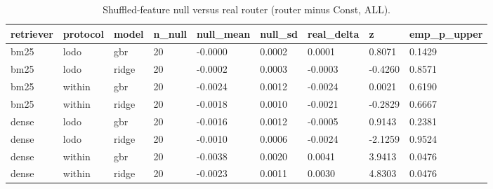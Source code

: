 \begin{table}[t]\centering\small
\caption{Shuffled-feature null versus real router (router minus Const, ALL).}\label{tab:c7}
\begin{tabular}{lllllllll}
\toprule
retriever & protocol & model & n\_null & null\_mean & null\_sd & real\_delta & z & emp\_p\_upper \\
\midrule
bm25 & lodo & gbr & 20 & -0.0000 & 0.0002 & 0.0001 & 0.8071 & 0.1429 \\
bm25 & lodo & ridge & 20 & -0.0002 & 0.0003 & -0.0003 & -0.4260 & 0.8571 \\
bm25 & within & gbr & 20 & -0.0024 & 0.0012 & -0.0024 & 0.0021 & 0.6190 \\
bm25 & within & ridge & 20 & -0.0018 & 0.0010 & -0.0021 & -0.2829 & 0.6667 \\
dense & lodo & gbr & 20 & -0.0016 & 0.0012 & -0.0005 & 0.9143 & 0.2381 \\
dense & lodo & ridge & 20 & -0.0010 & 0.0006 & -0.0024 & -2.1259 & 0.9524 \\
dense & within & gbr & 20 & -0.0038 & 0.0020 & 0.0041 & 3.9413 & 0.0476 \\
dense & within & ridge & 20 & -0.0023 & 0.0011 & 0.0030 & 4.8303 & 0.0476 \\
\bottomrule
\end{tabular}
\end{table}
